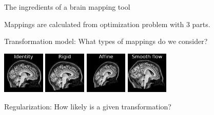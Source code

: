 \documentclass{beamer}
\begin{document}
\begin{frame}{The ingredients of a brain mapping tool}

Mappings are calculated from optimization problem with 3 parts.

\vspace{1em}

Transformation model: What types of mappings do we consider?

\includegraphics[width=0.15\textwidth]{ex2_id}
\includegraphics[width=0.15\textwidth]{ex2_rigid}
\includegraphics[width=0.15\textwidth]{ex2_affine}
\includegraphics[width=0.15\textwidth]{ex2_flow}



\vspace{1em}
Regularization: How likely is a given transformation?


\end{frame}
\end{document}
